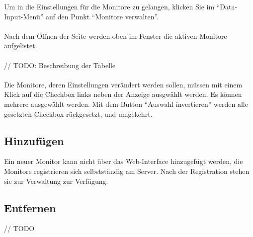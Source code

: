 Um in die Einstellungen für die Monitore zu gelangen, klicken Sie im \enquote{Data-Input-Menü} auf den Punkt \enquote{Monitore verwalten}.\\
\\
Nach dem Öffnen der Seite werden oben im Fenster die aktiven Monitore aufgelistet.\\
\\
// TODO: Beschreibung der Tabelle\\
\\
Die Monitore, deren Einstellungen verändert werden sollen, müssen mit einem Klick auf die Checkbox links neben der Anzeige ausgwählt werden. Es können mehrere ausgewählt werden. Mit dem Button \enquote{Auswahl invertieren} werden alle gesetzten Checkbox rückgesetzt, und umgekehrt.
\\
\subsection{Hinzufügen}

Ein neuer Monitor kann nicht über das Web-Interface hinzugefügt werden, die Monitore registrieren sich selbstständig am Server. Nach der Registration stehen sie zur Verwaltung zur Verfügung.

\subsection{Entfernen}

// TODO